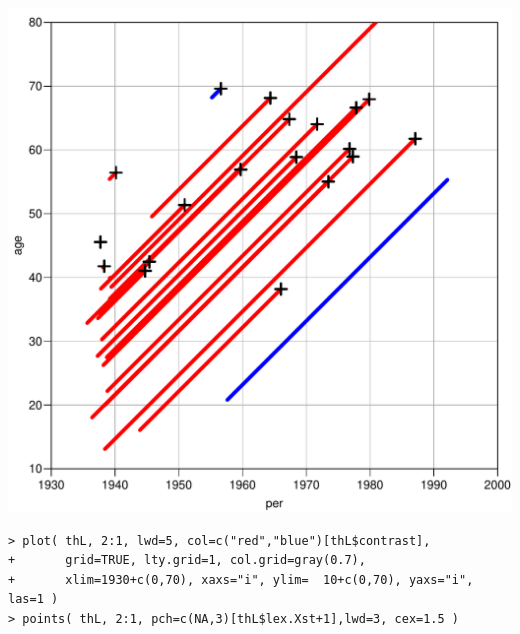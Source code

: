 \begin{frame}[fragile]
\includegraphics[height=0.80\textheight,keepaspectratio]{thL-lexis2}
\vspace*{-1ex}
{\scriptsize
\begin{verbatim}
> plot( thL, 2:1, lwd=5, col=c("red","blue")[thL$contrast],
+       grid=TRUE, lty.grid=1, col.grid=gray(0.7),
+       xlim=1930+c(0,70), xaxs="i", ylim=  10+c(0,70), yaxs="i", las=1 )
> points( thL, 2:1, pch=c(NA,3)[thL$lex.Xst+1],lwd=3, cex=1.5 )
\end{verbatim}}
\end{frame}

